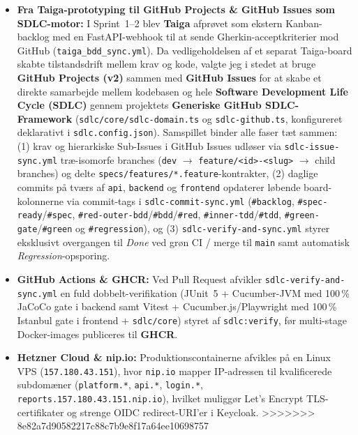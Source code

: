 \documentclass[11pt,a4paper]{article}
\begin{document}
\begin{table}[htbp]
\begin{itemize}[noitemsep]
    \item \textbf{Fra Taiga-prototyping til GitHub Projects \& GitHub Issues som SDLC-motor:} I Sprint~1--2 blev \textbf{Taiga} afprøvet som ekstern Kanban-backlog med en FastAPI-webhook til at sende Gherkin-acceptkriterier mod GitHub (\texttt{taiga\_bdd\_sync.yml}). Da vedligeholdelsen af et separat Taiga-board skabte tilstandsdrift mellem krav og kode, valgte jeg i stedet at bruge \textbf{GitHub Projects (v2)} sammen med \textbf{GitHub Issues} for at skabe et direkte samarbejde mellem kodebasen og hele \textbf{Software Development Life Cycle (SDLC)} gennem projektets \textbf{Generiske GitHub SDLC-Framework} (\texttt{sdlc/core/sdlc-domain.ts} og \texttt{sdlc-github.ts}, konfigureret deklarativt i \texttt{sdlc.config.json}). Samspillet binder alle faser tæt sammen: (1) krav og hierarkiske Sub-Issues i GitHub Issues udløser via \texttt{sdlc-issue-sync.yml} træ-isomorfe branches (\texttt{dev} $\rightarrow$ \texttt{feature/<id>-<slug>} $\rightarrow$ child branches) og delte \texttt{specs/features/*.feature}-kontrakter, (2) daglige commits på tværs af \texttt{api}, \texttt{backend} og \texttt{frontend} opdaterer løbende board-kolonnerne via commit-tags i \texttt{sdlc-commit-sync.yml} (\texttt{\#backlog}, \texttt{\#spec-ready}/\texttt{\#spec}, \texttt{\#red-outer-bdd}/\texttt{\#bdd}/\texttt{\#red}, \texttt{\#inner-tdd}/\texttt{\#tdd}, \texttt{\#green-gate}/\texttt{\#green} og \texttt{\#regression}), og (3) \texttt{sdlc-verify-and-sync.yml} styrer eksklusivt overgangen til \textit{Done} ved grøn CI / merge til \texttt{main} samt automatisk \textit{Regression}-opsporing.
    \item \textbf{GitHub Actions \& GHCR:} Ved Pull Request afvikler \texttt{sdlc-verify-and-sync.yml} en fuld dobbelt-verifikation (JUnit~5 + Cucumber-JVM med 100\,\% JaCoCo gate i backend samt Vitest + Cucumber.js/Playwright med 100\,\% Istanbul gate i frontend + \texttt{sdlc/core}) styret af \texttt{sdlc:verify}, før multi-stage Docker-images publiceres til \textbf{GHCR}.
    \item \textbf{Hetzner Cloud \& nip.io:} Produktionscontainerne afvikles på en Linux VPS (\texttt{157.180.43.151}), hvor \texttt{nip.io} mapper IP-adressen til kvalificerede subdomæner (\texttt{platform.*}, \texttt{api.*}, \texttt{login.*}, \texttt{reports.157.180.43.151.nip.io}), hvilket muliggør Let's Encrypt TLS-certifikater og strenge OIDC redirect-URI'er i Keycloak.
>>>>>>> 8e82a7d90582217c88c7b9e8f17a64ee10698757
\end{itemize}


\end{table}
\end{document}
